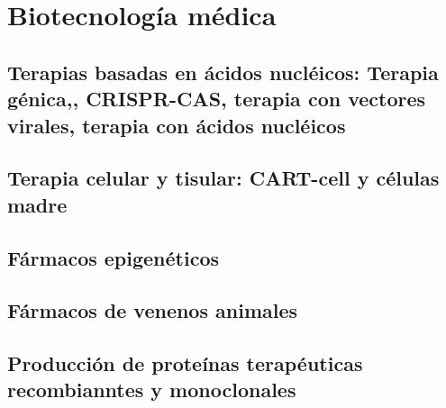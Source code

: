 \documentclass{../summarie}
\begin{document}
\part{Biotecnología médica}

    \chapter{Terapias basadas en ácidos nucléicos: Terapia génica,, CRISPR-CAS, terapia con vectores virales, terapia con ácidos nucléicos}
    \chapter{Terapia celular y tisular: CART-cell y células madre}
    \chapter{Fármacos epigenéticos}
    \chapter{Fármacos de venenos animales}
    \chapter{Producción de proteínas terapéuticas recombianntes y monoclonales}


\newpage


\end{document}
